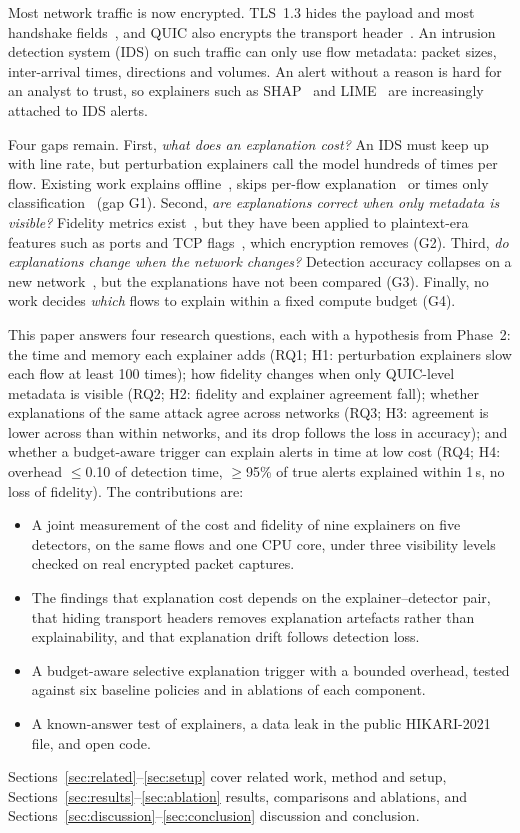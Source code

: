 \documentclass[pdflatex,iicol,sn-mathphys-num]{sn-jnl}
\begin{document}
Most network traffic is now encrypted. TLS~1.3 hides the payload and most handshake fields~\cite{rfc8446}, and QUIC also encrypts the transport header~\cite{rfc9000}. An intrusion detection system (IDS) on such traffic can only use flow metadata: packet sizes, inter-arrival times, directions and volumes. An alert without a reason is hard for an analyst to trust, so explainers such as SHAP~\cite{lundberg2017,lundberg2020} and LIME~\cite{ribeiro2016} are increasingly attached to IDS alerts.

Four gaps remain. First, \emph{what does an explanation cost?} An IDS must keep up with line rate, but perturbation explainers call the model hundreds of times per flow. Existing work explains offline~\cite{kalakoti2026}, skips per-flow explanation~\cite{dmthreatnet2026} or times only classification~\cite{cerasuolo2026} (gap G1). Second, \emph{are explanations correct when only metadata is visible?} Fidelity metrics exist~\cite{bhatt2020,samek2017,yeh2019}, but they have been applied to plaintext-era features such as ports and TCP flags~\cite{p2,p6,p10}, which encryption removes (G2). Third, \emph{do explanations change when the network changes?} Detection accuracy collapses on a new network~\cite{cerasuolo2026,p9}, but the explanations have not been compared (G3). Finally, no work decides \emph{which} flows to explain within a fixed compute budget (G4).

This paper answers four research questions, each with a hypothesis from Phase~2: the time and memory each explainer adds (RQ1; H1: perturbation explainers slow each flow at least 100 times); how fidelity changes when only QUIC-level metadata is visible (RQ2; H2: fidelity and explainer agreement fall); whether explanations of the same attack agree across networks (RQ3; H3: agreement is lower across than within networks, and its drop follows the loss in accuracy); and whether a budget-aware trigger can explain alerts in time at low cost (RQ4; H4: overhead $\le$0.10 of detection time, $\ge$95\% of true alerts explained within 1\,s, no loss of fidelity). The contributions are:
\begin{itemize}
\item A joint measurement of the cost and fidelity of nine explainers on five detectors, on the same flows and one CPU core, under three visibility levels checked on real encrypted packet captures.
\item The findings that explanation cost depends on the explainer--detector pair, that hiding transport headers removes explanation artefacts rather than explainability, and that explanation drift follows detection loss.
\item A budget-aware selective explanation trigger with a bounded overhead, tested against six baseline policies and in ablations of each component.
\item A known-answer test of explainers, a data leak in the public HIKARI-2021 file, and open code.
\end{itemize}
Sections~\ref{sec:related}--\ref{sec:setup} cover related work, method and setup, Sections~\ref{sec:results}--\ref{sec:ablation} results, comparisons and ablations, and Sections~\ref{sec:discussion}--\ref{sec:conclusion} discussion and conclusion.
\end{document}
